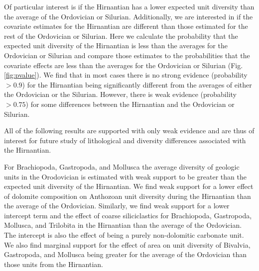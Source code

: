 \documentclass[12pt,letterpaper]{article}
\begin{document}
Of particular interest is if the Hirnantian has a lower expected unit diversity than the average of the Ordovician or Silurian. Additionally, we are interested in if the covariate estimates for the Hirnantian are different than those estimated for the rest of the Ordovician or Silurian. Here we calculate the probability that the expected unit diversity of the Hirnantian is less than the averages for the Ordovician or Silurian and compare those estimates to the probabilities that the covariate effects are less than the averages for the Ordovician or Silurian (Fig. \ref{fig:pvalue}). We find that in most cases there is no strong evidence (probability \(> 0.9\)) for the Hirnantian being significantly different from the averages of either the Ordovician or the Silurian. However, there is weak evidence (probability \(> 0.75\)) for some differences between the Hirnantian and the Ordovician or Silurian.

All of the following results are supported with only weak evidence and are thus of interest for future study of lithological and diversity differences associated with the Hirnantian.

For Brachiopoda, Gastropoda, and Mollusca the average diversity of geologic units in the Orodovician is estimated with weak support to be greater than the expected unit diversity of the Hirnantian. We find weak support for a lower effect of dolomite composition on Anthozoan unit diversity during the Hirnantian than the average of the Ordovician. Similarly, we find weak support for a lower intercept term and the effect of coarse siliciclastics for Brachiopoda, Gastropoda, Mollusca, and Trilobita in the Hirnantian than the average of the Ordovician. The intercept is also the effect of being a purely non-dolomitic carbonate unit. We also find marginal support for the effect of area on unit diversity of Bivalvia, Gastropoda, and Mollusca being greater for the average of the Ordovician than those units from the Hirnantian.
\end{document}
